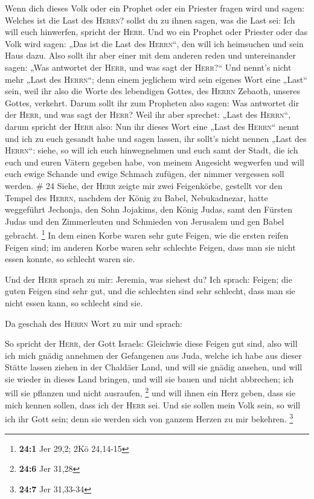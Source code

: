  Wenn dich dieses Volk oder ein Prophet oder ein Priester
fragen wird und sagen: Welches ist die Last des \textsc{Herrn}? sollst
du zu ihnen sagen, was die Last sei: Ich will euch hinwerfen, spricht
der \textsc{Herr}.  Und wo ein Prophet oder Priester oder
das Volk wird sagen: „Das ist die Last des \textsc{Herrn}``, den will
ich heimsuchen und sein Haus dazu.  Also sollt ihr aber
einer mit dem anderen reden und untereinander sagen: „Was antwortet der
\textsc{Herr}, und was sagt der \textsc{Herr}?{}``  Und
nennt's nicht mehr „Last des \textsc{Herrn}``; denn einem jeglichem wird
sein eigenes Wort eine „Last`` sein, weil ihr also die Worte des
lebendigen Gottes, des \textsc{Herrn} Zebaoth, unseres Gottes, verkehrt.
 Darum sollt ihr zum Propheten also sagen: Was antwortet
dir der \textsc{Herr}, und was sagt der \textsc{Herr}? 
Weil ihr aber sprechet: „Last des \textsc{Herrn}``, darum spricht der
\textsc{Herr} also: Nun ihr dieses Wort eine „Last des \textsc{Herrn}``
nennt und ich zu euch gesandt habe und sagen lassen, ihr sollt's nicht
nennen „Last des \textsc{Herrn}``:  siehe, so will ich
euch hinwegnehmen und euch samt der Stadt, die ich euch und euren Vätern
gegeben habe, von meinem Angesicht wegwerfen  und will
euch ewige Schande und ewige Schmach zufügen, der nimmer vergessen soll
werden. \# 24  Siehe, der \textsc{Herr} zeigte mir zwei
Feigenkörbe, gestellt vor den Tempel des \textsc{Herrn}, nachdem der
König zu Babel, Nebukadnezar, hatte weggeführt Jechonja, den Sohn
Jojakims, den König Judas, samt den Fürsten Judas und den Zimmerleuten
und Schmieden von Jerusalem und gen Babel gebracht. \footnote{\textbf{24:1}
  Jer 29,2; 2Kö 24,14-15}  In dem einen Korbe waren sehr
gute Feigen, wie die ersten reifen Feigen sind; im anderen Korbe waren
sehr schlechte Feigen, dass man sie nicht essen konnte, so schlecht
waren sie.

 Und der \textsc{Herr} sprach zu mir: Jeremia, was siehest
du? Ich sprach: Feigen; die guten Feigen sind sehr gut, und die
schlechten sind sehr schlecht, dass man sie nicht essen kann, so
schlecht sind sie.

 Da geschah des \textsc{Herrn} Wort zu mir und sprach:

 So spricht der \textsc{Herr}, der Gott Israels: Gleichwie
diese Feigen gut sind, also will ich mich gnädig annehmen der Gefangenen
aus Juda, welche ich habe aus dieser Stätte lassen ziehen in der
Chaldäer Land,  und will sie gnädig ansehen, und will sie
wieder in dieses Land bringen, und will sie bauen und nicht abbrechen;
ich will sie pflanzen und nicht ausraufen, \footnote{\textbf{24:6} Jer
  31,28}  und will ihnen ein Herz geben, dass sie mich
kennen sollen, dass ich der \textsc{Herr} sei. Und sie sollen mein Volk
sein, so will ich ihr Gott sein; denn sie werden sich von ganzem Herzen
zu mir bekehren. \footnote{\textbf{24:7} Jer 31,33-34}

